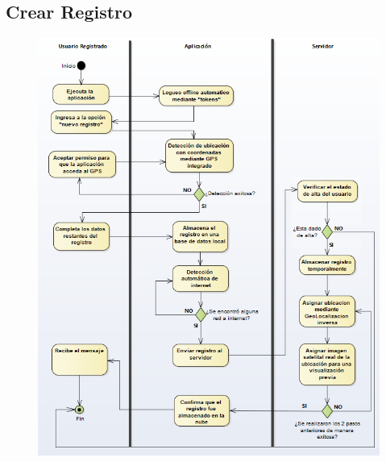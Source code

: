 		\subsection{Crear Registro }
			\begin{figure}[H]
			\centering
				\includegraphics{imagenes/analisis/diagrama-actividad-crear-registro.png}
				\label{fig:diagrama-actividad-crear-tienda}
			\end{figure}

